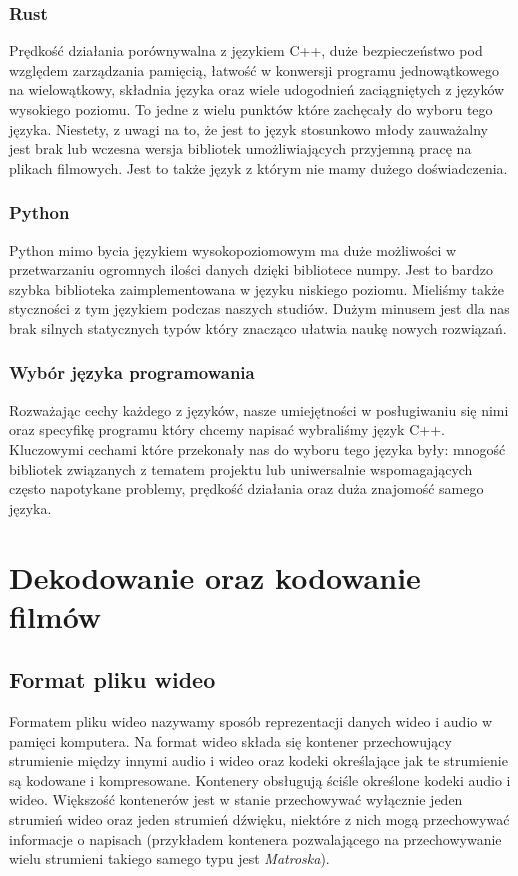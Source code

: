 \documentclass[twoside]{projektInzynierskiMS}
\begin{document}
\subsubsection{Rust}
Prędkość działania porównywalna z językiem C++, duże bezpieczeństwo pod względem zarządzania pamięcią, łatwość w konwersji programu jednowątkowego na wielowątkowy, składnia języka oraz wiele udogodnień zaciągniętych z języków wysokiego poziomu. To jedne z wielu punktów które zachęcały do wyboru tego języka. Niestety, z uwagi na to, że jest to język stosunkowo młody zauważalny jest brak lub wczesna wersja bibliotek umożliwiających przyjemną pracę na plikach filmowych. Jest to także język z którym nie mamy dużego doświadczenia.

\subsubsection{Python}
Python mimo bycia językiem wysokopoziomowym ma duże możliwości w przetwarzaniu ogromnych ilości danych dzięki bibliotece numpy. Jest to bardzo szybka biblioteka zaimplementowana w języku niskiego poziomu. Mieliśmy także styczności z tym językiem podczas naszych studiów. Dużym minusem jest dla nas brak silnych statycznych typów który znacząco ułatwia naukę nowych rozwiązań.

\subsubsection{Wybór języka programowania}
Rozważając cechy każdego z języków, nasze umiejętności w posługiwaniu się nimi oraz specyfikę programu który chcemy napisać wybraliśmy język C++. Kluczowymi cechami które przekonały nas do wyboru tego języka były: mnogość bibliotek związanych z tematem projektu lub uniwersalnie wspomagających często napotykane problemy, prędkość działania oraz duża znajomość samego języka.


\section{Dekodowanie oraz kodowanie filmów}

\subsection{Format pliku wideo}
Formatem pliku wideo nazywamy sposób reprezentacji danych wideo i audio w pamięci komputera. Na format wideo składa się kontener przechowujący strumienie między innymi audio i wideo oraz kodeki określające jak te strumienie są kodowane i kompresowane. Kontenery obsługują ściśle określone kodeki audio i wideo. Większość kontenerów jest w stanie przechowywać wyłącznie jeden strumień wideo oraz jeden strumień dźwięku, niektóre z nich mogą przechowywać informacje o napisach (przykładem kontenera pozwalającego na przechowywanie wielu strumieni takiego samego typu jest \emph{Matroska}).
\end{document}
